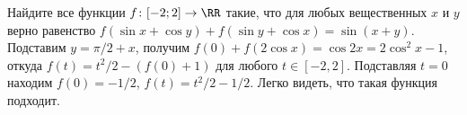 \problem{}
Найдите все функции $f \colon [-2; 2] \to \RR$ такие, что для любых
вещественных $x$ и $y$ верно равенство
$f(\sin x + \cos y) + f(\sin y + \cos x) = \sin(x + y)$.
\solution
Подставим $y = \pi / 2 + x$, получим
$f(0) + f(2 \cos x) = \cos 2 x = 2 \cos^2 x - 1$,
откуда $f(t) = t^2 / 2 - (f(0) + 1)$ для любого $t \in [-2,2]$.
Подставляя $t = 0$ находим $f(0) = -1 / 2$, $f(t) = t^2 / 2 - 1/2$.
Легко видеть, что такая функция подходит.
\endproblem
